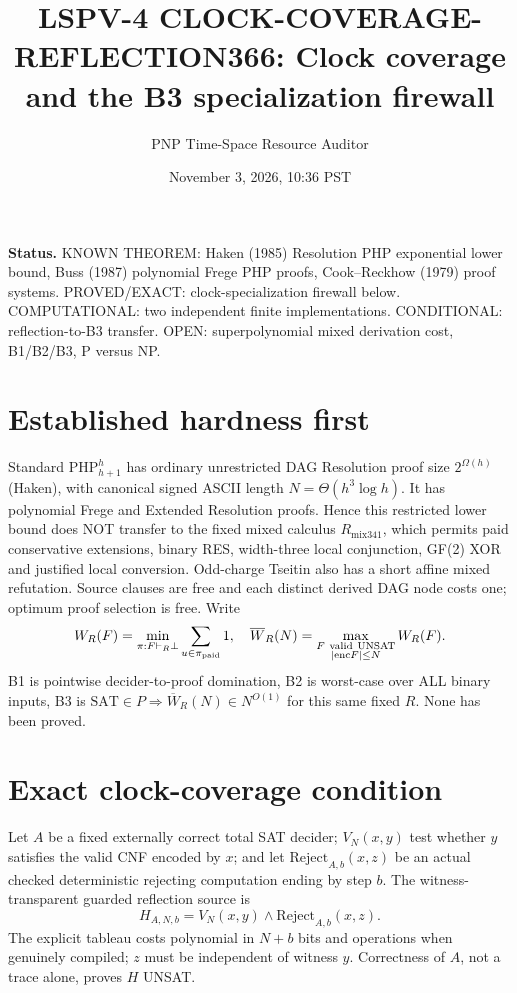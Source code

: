\documentclass{article}
\title{LSPV-4 CLOCK-COVERAGE-REFLECTION366: Clock coverage and the B3 specialization firewall}
\author{PNP Time-Space Resource Auditor}
\date{November 3, 2026, 10:36 PST}
\begin{document}
\maketitle
\noindent\textbf{Status.} KNOWN THEOREM: Haken (1985) Resolution PHP exponential lower bound, Buss (1987) polynomial Frege PHP proofs, Cook--Reckhow (1979) proof systems. PROVED/EXACT: clock-specialization firewall below. COMPUTATIONAL: two independent finite implementations. CONDITIONAL: reflection-to-B3 transfer. OPEN: superpolynomial mixed derivation cost, B1/B2/B3, P versus NP.

\section*{Established hardness first}
Standard $\mathrm{PHP}_{h+1}^{h}$ has ordinary unrestricted DAG Resolution proof size $2^{\Omega(h)}$ (Haken), with canonical signed ASCII length $N=\Theta(h^3\log h)$. It has polynomial Frege and Extended Resolution proofs. Hence this restricted lower bound does NOT transfer to the fixed mixed calculus $R_{\mathrm{mix341}}$, which permits paid conservative extensions, binary RES, width-three local conjunction, GF(2) XOR and justified local conversion. Odd-charge Tseitin also has a short affine mixed refutation. Source clauses are free and each distinct derived DAG node costs one; optimum proof selection is free. Write
\[
W_R(F)=\min_{\pi:F\vdash_R\bot} \sum_{u\in\pi_{\rm paid}}1,\quad
\overline W_R(N)=\max_{\substack{F\ {\rm valid\ UNSAT}\\|\mathrm{enc}F|\le N}} W_R(F).
\]
B1 is pointwise decider-to-proof domination, B2 is worst-case over ALL binary inputs, B3 is $\mathrm{SAT}\in P\Rightarrow\overline W_R(N)\in N^{O(1)}$ for this same fixed $R$. None has been proved.

\section*{Exact clock-coverage condition}
Let $A$ be a fixed externally correct total SAT decider; $V_N(x,y)$ test whether $y$ satisfies the valid CNF encoded by $x$; and let $\mathrm{Reject}_{A,b}(x,z)$ be an actual checked deterministic rejecting computation ending by step $b$. The witness-transparent guarded reflection source is
\[
H_{A,N,b}=V_N(x,y)\land\mathrm{Reject}_{A,b}(x,z).
\]
The explicit tableau costs polynomial in $N+b$ bits and operations when genuinely compiled; $z$ must be independent of witness $y$. Correctness of $A$, not a trace alone, proves $H$ UNSAT.
\end{document}
